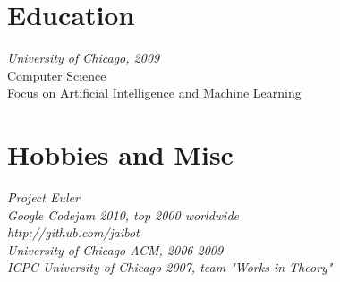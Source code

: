 \documentclass[9pt]{res} %
\begin{document}
\begin{resume}
\section{Education}

{\sl University of Chicago, 2009} \\
Computer Science \\
Focus on Artificial Intelligence and Machine Learning
 

\section{Hobbies and Misc} 

{\it Project Euler} \\
{\it Google Codejam 2010, top 2000 worldwide} \\
{\it http://github.com/jaibot } \\
{\it University of Chicago ACM, 2006-2009} \\
{\it ICPC University of Chicago 2007, team "Works in Theory"}



\end{resume}
\end{document}
